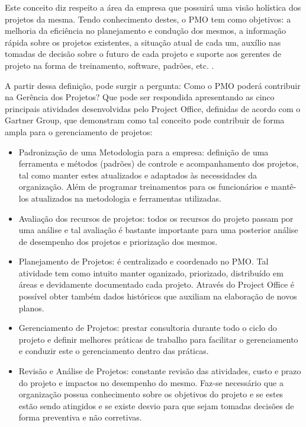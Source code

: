 \documentclass[12pt,a4paper,ruledheader,tocpage=prefix,floatnumber=continuous,pagestart=folhaderosto,font=times]{abnt}
\begin{document}
Este conceito diz respeito a área da empresa que possuirá uma visão holística dos projetos da mesma. Tendo conhecimento destes, o PMO tem como objetivos:
a melhoria da eficiência no planejamento e condução dos mesmos, a informação rápida sobre os projetos existentes, a situação atual de cada um, auxílio nas
tomadas de decisão sobre o futuro de cada projeto e suporte aos gerentes de projeto na forma de treinamento, software, padrões, etc. \cite{pmbok}.

A partir dessa definição, pode surgir a pergunta: Como o PMO poderá contribuir na Gerência dos Projetos? Que pode ser respondida apresentando as cinco
principais atividades desenvolvidas pelo Project Office, definidas de acordo com o Gartner Group, que demonstram como tal conceito pode contribuir de 
forma ampla para o gerenciamento de projetos:

\begin{itemize}
 \item Padronização de uma Metodologia para a empresa: definição de uma ferramenta e métodos (padrões) de controle e acompanhamento dos projetos, tal como
       manter estes atualizados e adaptados às necessidades da organização. Além de programar treinamentos para os funcionários e mantê-los atualizados
       na metodologia e ferramentas utilizadas.
 \item Avaliação dos recursos de projetos: todos os recursos do projeto passam por uma análise e tal avaliação é bastante importante para uma posterior 
       análise de desempenho dos projetos e priorização dos mesmos.
 \item Planejamento de Projetos: é centralizado e coordenado no PMO. Tal atividade tem como intuito manter oganizado, priorizado, distribuído em áreas
       e devidamente documentado cada projeto. Através do Project Office é possível obter também dados históricos que auxiliam na elaboração de novos planos.
 \item Gerenciamento de Projetos: prestar consultoria durante todo o ciclo do projeto e definir melhores práticas de trabalho para facilitar o gerenciamento
       e conduzir este o gerenciamento dentro das práticas.
 \item Revisão e Análise de Projetos: constante revisão das atividades, custo e prazo do projeto e impactos no desempenho do mesmo. Faz-se necessário que
       a organização possua conhecimento sobre os objetivos do projeto e se estes estão sendo atingidos e se existe desvio para que sejam tomadas decisões
       de forma preventiva e não corretivas.
\end{itemize}
\end{document}
